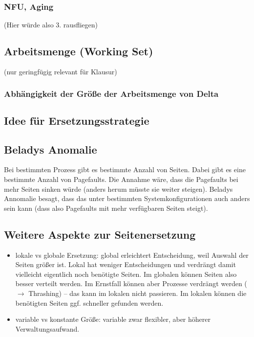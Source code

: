 \subsubsection{NFU, Aging}
(Hier würde also 3. rausfliegen)
\subsection{Arbeitsmenge (Working Set)}
(nur geringfügig relevant für Klausur)
\subsubsection{Abhängigkeit der Größe der Arbeitsmenge von Delta}
\subsection{Idee für Ersetzungsstrategie}

\subsection{Beladys Anomalie}
Bei bestimmten Prozess gibt es bestimmte Anzahl von Seiten. Dabei gibt es eine bestimmte Anzahl von Pagefaults. Die Annahme wäre, dass die Pagefaults bei mehr Seiten sinken würde (anders herum müsste sie weiter steigen). Beladys Annomalie besagt, dass das unter bestimmten Systemkonfigurationen auch anders sein kann (dass also Pagefaults mit mehr verfügbaren Seiten steigt).

\subsection{Weitere Aspekte zur Seitenersetzung}
\begin{itemize}
\item lokale vs globale Ersetzung: global erleichtert Entscheidung, weil Auswahl der Seiten größer ist. Lokal hat weniger Entscheidungen und verdrängt damit vielleicht eigentlich noch benötigte Seiten. Im globalen können Seiten also besser verteilt werden. Im Ernstfall können aber Prozesse verdrängt werden ($\to$ Thrashing) -- das kann im lokalen nicht passieren. Im lokalen können die benötigten Seiten ggf. schneller gefunden werden.
\item variable vs konstante Größe: variable zwar flexibler, aber höherer Verwaltungsaufwand.
\end{itemize}

